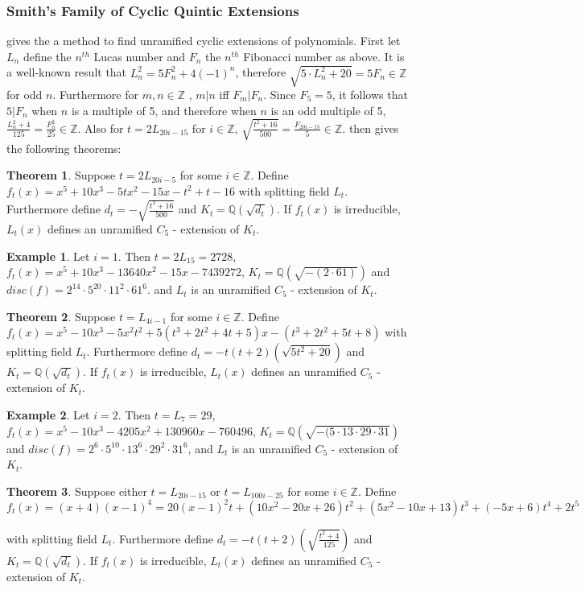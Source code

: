 \documentclass[12pt]{extarticle}
\newcommand{\Q}{\mathbb{Q}}
\newcommand{\Z}{\mathbb{Z}}
\newcommand{\<}{\langle}
\renewcommand{\>}{\rangle}
\theoremstyle{definition}
\newtheorem{theorem}{Theorem}
\newtheorem*{example}{Example}
\begin{document}
\subsubsection{Smith's Family of Cyclic Quintic Extensions}
\cite{SMITH} gives the a method to find unramified cyclic extensions of polynomials. First let $L_n$ define the $n^{th}$ Lucas number and $F_n$ the $n^{th}$ Fibonacci number as above. It is a well-known result that $L_n^2 = 5F_n^2+4(-1)^n$, therefore $\sqrt{5 \cdot L_n^2+20} = 5F_n \in \Z$ for odd $n$. Furthermore for $m,n \in \Z$ , $m|n$ iff $F_m | F_n$. Since $F_5 = 5$, it follows that $5| F_n $ when $n$ is a multiple of 5, and therefore when $n$ is an odd multiple of 5, $\frac{L_n^2+4}{125} = \frac{F_n^2}{25} \in \Z$. Also for $t = 2L_{20i-15}$ for $i \in \Z$, $\sqrt{\frac{t^2+16}{500}} = \frac{F_{20i-15}}{5} \in \Z$. 
\cite{SMITH} then gives the following theorems:
\begin{theorem}
Suppose $t = 2L_{20i-5}$ for some $i \in \Z$. Define $f_t(x) = x^5 + 10x^3 - 5tx^2-15x-t^2+t-16$ with splitting field $L_t$. Furthermore define $d_t = -\sqrt{\frac{t^2+16}{500}}$ and $K_t = \Q(\sqrt{d_t})$. If $f_t(x)$ is irreducible, $L_t(x)$ defines an unramified $C_5$ - extension of $K_t$. 
\end{theorem}
\begin{example}
Let $i=1$. Then $t=2L_{15} = 2728$, $f_t(x) = x^5 + 10x^3 - 13640x^2 - 15x - 7439272$, $K_t = \Q(\sqrt{-(2 \cdot 61)})$ and $disc(f) = 2^{14} \cdot 5^{20} \cdot 11^2 \cdot 61^6$. and $L_t$ is an unramified $C_5$ - extension of $K_t$. 
\end{example}
\begin{theorem}
Suppose $t = L_{4i-1}$ for some $i \in \Z$. Define $f_t(x) = x^5 -10x^3 - 5x^2t^2+5(t^3+2t^2+4t+5)x-(t^3+2t^2+5t+8)$ with splitting field $L_t$. Furthermore define $d_t = -t(t+2)(\sqrt{5t^2+20})$ and $K_t = \Q(\sqrt{d_t})$. If $f_t(x)$ is irreducible, $L_t(x)$ defines an unramified $C_5$ - extension of $K_t$.
\end{theorem}
\begin{example}
Let $i=2$. Then $t=L_{7} = 29$, $f_t(x) = x^5 - 10x^3 - 4205x^2 + 130960x - 760496$, $K_t = \Q(\sqrt{-( 5 \cdot 13 \cdot 29 \cdot 31})$ and $disc(f) =2^6 \cdot 5^{10} \cdot 13^6 \cdot 29^2 \cdot 31^6$,  and $L_t$ is an unramified $C_5$ - extension of $K_t$. 
\end{example}
\begin{theorem}
Suppose either $t = L_{20i-15}$ or $t = L_{100i-25}$ for some $i \in \Z$. Define $f_t(x) = (x+4)(x-1)^4 = 20(x-1)^2t + (10x^2-20x+26)t^2 + (5x^2-10x+13)t^3 +(-5x+6)t^4 + 2t^5$

 with splitting field $L_t$. Furthermore define $d_t = -t(t+2)\left(\sqrt{\frac{t^2+4}{125}}\right)$ and $K_t = \Q(\sqrt{d_t})$. If $f_t(x)$ is irreducible, $L_t(x)$ defines an unramified $C_5$ - extension of $K_t$. 
\end{theorem}
\end{document}
